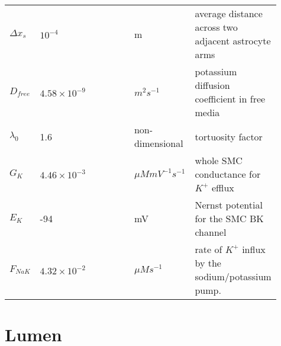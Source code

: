 \documentclass[fleqn]{report}
\numberwithin{equation}{section}
\numberwithin{equation}{section}
\begin{document}
					\begin{table}[h!]
						\centering
						\begin{tabular}{ p{0.09\linewidth}  >{\footnotesize} p{0.42\linewidth}  >{\footnotesize} p{0.17\linewidth} >{\footnotesize} p{0.23\linewidth} }
							\hline
							$ \Delta x_s $	& $10^{-4}$ 		& 	m	& average distance across two adjacent astrocyte arms   \\ 
							$ D_{free}  $	&   $4.58 \times 10^{-9}$	& $m^2 s^{-1}$  	&  potassium diffusion coefficient in free media  \\  
							$ \lambda_0  $	&  1.6		& non-dimensional   	&  tortuosity factor 	\\
							$  G_{K} $ 	& $4.46 \times 10^{-3}$  &   $\mu M mV^{-1} s^{-1} $    &  whole SMC conductance for $K^+$ efflux    \\ 
							$  E_{K} $ 	& -94  &   mV   &    Nernst potential for the SMC BK channel  \\  
							$  F_{NaK} $ 	& $4.32 \times 10^{-2}$  &  $\mu M s^{-1}$   &  rate of $K^+$ influx by the sodium/potassium pump.     \\  
							\hline
						\end{tabular}
					\end{table}	
	\section{Lumen}
			
\end{document}
